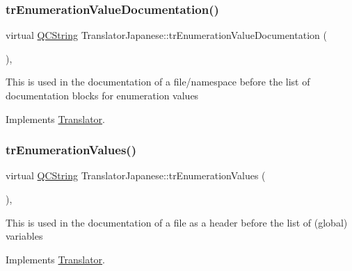 \mbox{\label{class_translator_japanese_af07831d86b7a4f50b7fd3133cec19435}} 
\subsubsection{\texorpdfstring{trEnumerationValueDocumentation()}{trEnumerationValueDocumentation()}}
{\footnotesize\ttfamily virtual \mbox{\hyperlink{class_q_c_string}{Q\+C\+String}} Translator\+Japanese\+::tr\+Enumeration\+Value\+Documentation (\begin{DoxyParamCaption}{ }\end{DoxyParamCaption})\hspace{0.3cm}{\ttfamily [inline]}, {\ttfamily [virtual]}}

This is used in the documentation of a file/namespace before the list of documentation blocks for enumeration values 

Implements \mbox{\hyperlink{class_translator}{Translator}}.

\mbox{\label{class_translator_japanese_aba8a889c15994fe5f72524ac157a18cb}} 
\subsubsection{\texorpdfstring{trEnumerationValues()}{trEnumerationValues()}}
{\footnotesize\ttfamily virtual \mbox{\hyperlink{class_q_c_string}{Q\+C\+String}} Translator\+Japanese\+::tr\+Enumeration\+Values (\begin{DoxyParamCaption}{ }\end{DoxyParamCaption})\hspace{0.3cm}{\ttfamily [inline]}, {\ttfamily [virtual]}}

This is used in the documentation of a file as a header before the list of (global) variables 

Implements \mbox{\hyperlink{class_translator}{Translator}}.

\mbox{\label{class_translator_japanese_a9a2691028093ed98f8ecb5b16e5903f7}} 
